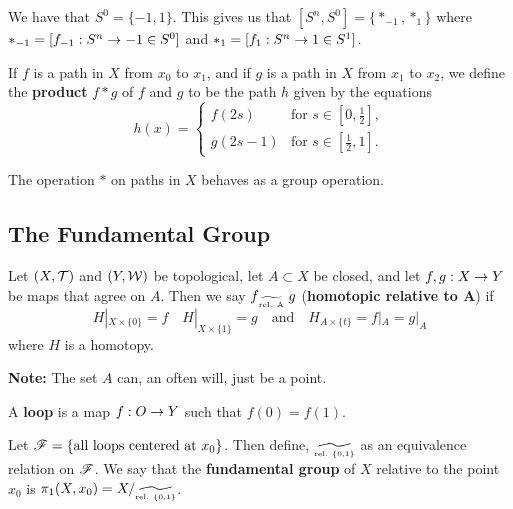 We have that $S^0 = \{-1,1\}$. This gives us that $[S^n, S^0] = \{*_{-1}, *_{1}\}$ where $*_{-1} = [f_{-1}:S^n \rightarrow -1\in S^0]$ and $*_{1} = [f_{1}:S^n\rightarrow 1\in S^1]$.

\vs

\dfn If $f$ is a path in $X$ from $x_0$ to $x_1$, and if $g$ is a path in $X$ from $x_1$ to $x_2$, we define the \textbf{product} $f*g$ of $f$ and $g$ to be the path $h$ given by the equations
\[h(x) = \begin{cases} f(2s) & \text{for } s\in [0,\frac{1}{2}],\\ g(2s - 1) & \text{for }s\in [\frac{1}{2}, 1].\end{cases}\]

\vs

\begin{thm}
The operation $*$ on paths in $X$ behaves as a group operation.
\end{thm}





\subsection{The Fundamental Group}\nl
\setcounter{section}{52}
\setcounter{thm}{0}


\dfn Let $(X, \mathcal{T})$ and $(Y, \mathcal{W})$ be topological, let $A\subset X$ be closed, and let $f,g:X\rightarrow Y$ be maps that agree on $A$. Then we say $f{\lower 4.5pt \hbox{$\widetilde{\text{\tiny rel. A}}$}}\ g$ (\textbf{homotopic relative to $\boldsymbol A$}) if
\[H|_{X\times \{0\}} = f\quad H|_{X\times \{1\}} = g\quad \text{and}\quad H_{A\times\{t\}} = f|_A = g|_A\]
where $H$ is a homotopy.

\textbf{Note:} The set $A$ can, an often will, just be a point.

\dfn A \textbf{loop} is a map $f:O\rightarrow Y$ such that $f(0) = f(1)$.

\vs

\dfn Let $\mathscr{F} = \{\text{all loops centered at }x_0\}$. Then define, ${\lower 4.5pt \hbox{$\widetilde{\text{\tiny rel. \{0,1\}}}$}}$ as an equivalence relation on $\mathscr{F}$. We say that the \textbf{fundamental group} of $X$ relative to the point $x_0$ is $\pi_1(X, x_0) = X/{\lower 4.5pt \hbox{$\widetilde{\text{\tiny rel. \{0,1\}}}$}}$.


